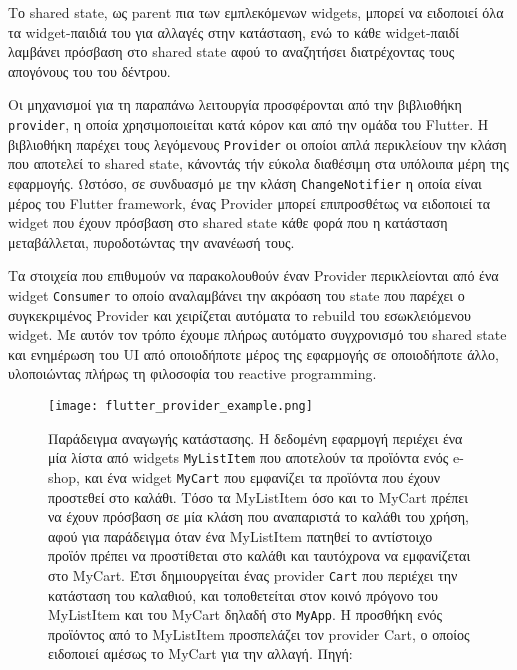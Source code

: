 \documentclass[../thesis.tex]{subfiles}
\begin{document}
Το shared state, ως parent πια των εμπλεκόμενων widgets, μπορεί να ειδοποιεί όλα τα widget-παιδιά του για αλλαγές στην κατάσταση, ενώ το κάθε widget-παιδί λαμβάνει πρόσβαση στο shared state αφού το αναζητήσει διατρέχοντας τους απογόνους του του δέντρου.

Οι μηχανισμοί για τη παραπάνω λειτουργία προσφέρονται από την βιβλιοθήκη \texttt{provider}\cite{flutter_provider}, η οποία χρησιμοποιείται κατά κόρον και από την ομάδα του Flutter.
Η βιβλιοθήκη παρέχει τους λεγόμενους \texttt{Provider} οι οποίοι απλά περικλείουν την κλάση που αποτελεί το shared state, κάνοντάς τήν εύκολα διαθέσιμη στα υπόλοιπα μέρη της εφαρμογής.
Ωστόσο, σε συνδυασμό με την κλάση \texttt{ChangeNotifier} η οποία είναι μέρος του Flutter framework, ένας Provider μπορεί επιπροσθέτως να ειδοποιεί τα widget που έχουν πρόσβαση στο shared state κάθε φορά που η κατάσταση μεταβάλλεται, πυροδοτώντας την ανανέωσή τους.

Τα στοιχεία που επιθυμούν να παρακολουθούν έναν Provider περικλείονται από ένα widget \texttt{Consumer} το οποίο αναλαμβάνει την ακρόαση του state που παρέχει ο συγκεκριμένος Provider και χειρίζεται αυτόματα το rebuild του εσωκλειόμενου widget.
Με αυτόν τον τρόπο έχουμε πλήρως αυτόματο συγχρονισμό του shared state και ενημέρωση του UI από οποιοδήποτε μέρος της εφαρμογής σε οποιοδήποτε άλλο, υλοποιώντας πλήρως τη φιλοσοφία του reactive programming.

\begin{figure}
    \texttt{[image: flutter\_provider\_example.png]}
    \centering
    \caption{Παράδειγμα αναγωγής κατάστασης. Η δεδομένη εφαρμογή περιέχει ένα μία λίστα από widgets \texttt{MyListItem} που αποτελούν τα προϊόντα ενός e-shop, και ένα widget \texttt{MyCart} που εμφανίζει τα προϊόντα που έχουν προστεθεί στο καλάθι. Τόσο τα MyListItem όσο και το MyCart πρέπει να έχουν πρόσβαση σε μία κλάση που αναπαριστά το καλάθι του χρήση, αφού για παράδειγμα όταν ένα MyListItem πατηθεί το αντίστοιχο προϊόν πρέπει να προστίθεται στο καλάθι και ταυτόχρονα να εμφανίζεται στο MyCart. Έτσι δημιουργείται ένας provider \texttt{Cart} που περιέχει την κατάσταση του καλαθιού, και τοποθετείται στον κοινό πρόγονο του MyListItem και του MyCart δηλαδή στο \texttt{MyApp}. Η προσθήκη ενός προϊόντος από το MyListItem προσπελάζει τον provider Cart, ο οποίος ειδοποιεί αμέσως το MyCart για την αλλαγή. Πηγή: \cite{flutter_state}}
\end{figure}
\end{document}
